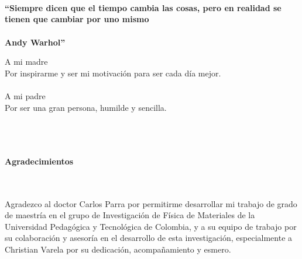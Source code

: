 \newpage{\pagestyle{empty}}%

\newpage
\thispagestyle{empty} \textbf{}\normalsize
\\\\\\%
\textbf{``Siempre dicen que el tiempo cambia las cosas, pero en realidad se tienen que cambiar por uno mismo\"\\\\
    Andy Warhol''}\\[4.0cm]

\begin{flushright}
    \begin{minipage}{8cm}
        \noindent
        \small
        A mi madre\\
        Por inspirarme y ser mi motivación para ser cada día mejor. \\
        [1.0cm]\\
        A mi padre\\
        Por ser una gran persona, humilde y sencilla.
        \\

    \end{minipage}
\end{flushright}

\newpage{\pagestyle{empty}}%

\newpage
\thispagestyle{empty} \textbf{}\normalsize
\\\\\\%
\textbf{\LARGE Agradecimientos}
{}\\\\

Agradezco al doctor Carlos Parra por permitirme desarrollar mi trabajo de grado de maestría
en el grupo de Investigación de Física de Materiales de la Universidad Pedagógica y Tecnológica de Colombia,
y a su equipo de trabajo por su colaboración y asesoría en el desarrollo de esta investigación,
especialmente a Christian Varela por su dedicación, acompañamiento y esmero.

\newpage{\pagestyle{empty}}%

